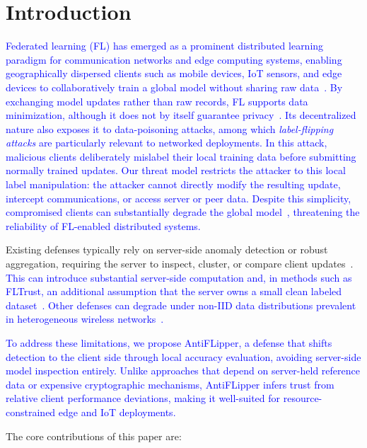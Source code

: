 \documentclass[conference]{IEEEtran}
\begin{document}
\section{Introduction}

\textcolor{blue}{Federated learning (FL) has emerged as a prominent distributed learning paradigm for communication networks and edge computing systems, enabling geographically dispersed clients such as mobile devices, IoT sensors, and edge devices to collaboratively train a global model without sharing raw data~\cite{fedavg-pmlr-v54-mcmahan17a,li2020federated}. By exchanging model updates rather than raw records, FL supports data minimization, although it does not by itself guarantee privacy~\cite{kairouz2021advances,lyu2020threats}. Its decentralized nature also exposes it to data-poisoning attacks, among which \textit{label-flipping attacks} are particularly relevant to networked deployments. In this attack, malicious clients deliberately mislabel their local training data before submitting normally trained updates. Our threat model restricts the attacker to this local label manipulation: the attacker cannot directly modify the resulting update, intercept communications, or access server or peer data. Despite this simplicity, compromised clients can substantially degrade the global model~\cite{biggio2011support,tolpegin2020data}, threatening the reliability of FL-enabled distributed systems.} 

Existing defenses typically rely on server-side anomaly detection or robust aggregation, requiring the server to inspect, cluster, or compare client updates~\cite{nguyen2022flame,yin2018byzantine,NIPS2017_f4b9ec30}. \textcolor{blue}{This can introduce substantial server-side computation and, in methods such as FLTrust, an additional assumption that the server owns a small clean labeled dataset~\cite{cao2020fltrust}. Other defenses can degrade under non-IID data distributions prevalent in heterogeneous wireless networks~\cite{fung2020limitations}.}

\textcolor{blue}{To address these limitations, we propose AntiFLipper, a defense that shifts detection to the client side through local accuracy evaluation, avoiding server-side model inspection entirely. Unlike approaches that depend on server-held reference data or expensive cryptographic mechanisms, AntiFLipper infers trust from relative client performance deviations, making it well-suited for resource-constrained edge and IoT deployments.}

The core contributions of this paper are:
\end{document}
